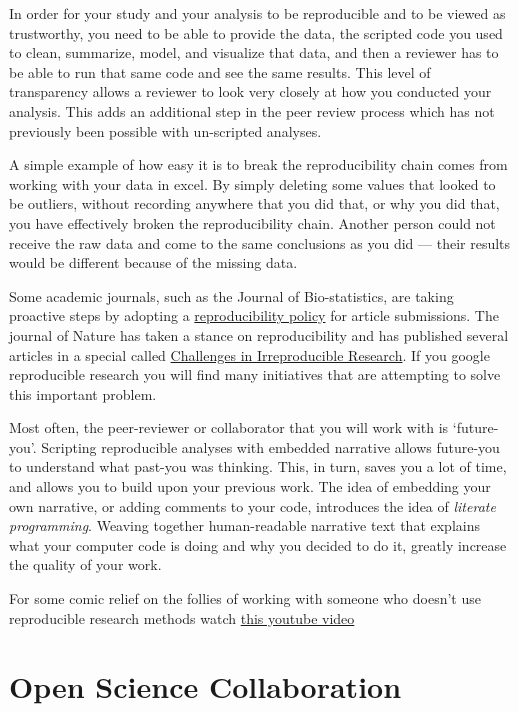 \documentclass[]{book}
\begin{document}
In order for your study and your analysis to be reproducible and to be
viewed as trustworthy, you need to be able to provide the data, the
scripted code you used to clean, summarize, model, and visualize that
data, and then a reviewer has to be able to run that same code and see
the same results. This level of transparency allows a reviewer to look
very closely at how you conducted your analysis. This adds an additional
step in the peer review process which has not previously been possible
with un-scripted analyses.

A simple example of how easy it is to break the reproducibility chain
comes from working with your data in excel. By simply deleting some
values that looked to be outliers, without recording anywhere that you
did that, or why you did that, you have effectively broken the
reproducibility chain. Another person could not receive the raw data and
come to the same conclusions as you did --- their results would be
different because of the missing data.

Some academic journals, such as the Journal of Bio-statistics, are
taking proactive steps by adopting a
\href{https://academic.oup.com/biostatistics/article/10/3/405/293660/Reproducible-research-and-Biostatistics\#3746779}{reproducibility
policy} for article submissions. The journal of Nature has taken a
stance on reproducibility and has published several articles in a
special called
\href{https://www.nature.com/news/reproducibility-1.17552}{Challenges in
Irreproducible Research}. If you google reproducible research you will
find many initiatives that are attempting to solve this important
problem.

Most often, the peer-reviewer or collaborator that you will work with is
`future-you'. Scripting reproducible analyses with embedded narrative
allows future-you to understand what past-you was thinking. This, in
turn, saves you a lot of time, and allows you to build upon your
previous work. The idea of embedding your own narrative, or adding
comments to your code, introduces the idea of \emph{literate
programming}. Weaving together human-readable narrative text that
explains what your computer code is doing and why you decided to do it,
greatly increase the quality of your work.

For some comic relief on the follies of working with someone who doesn't
use reproducible research methods watch
\href{https://www.youtube.com/watch?v=N2zK3sAtr-4\&feature=youtu.be}{this
youtube video}

\section{Open Science Collaboration}\label{open-science-collaboration}
\end{document}
